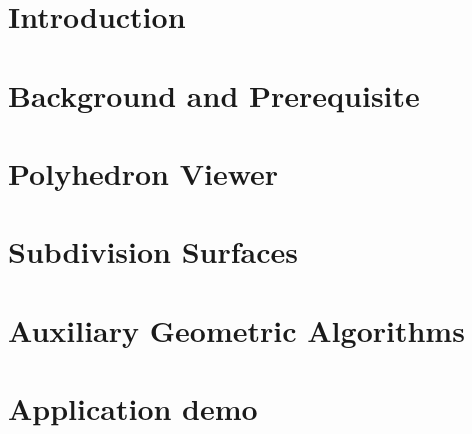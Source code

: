 \documentclass[letter,twoside,10pt]{article}
\begin{document}
\section{Introduction}


\section{Background and Prerequisite}
 

\section{Polyhedron Viewer}


\section{Subdivision Surfaces}


\section{Auxiliary Geometric Algorithms}


\section{Application demo}




\end{document}
